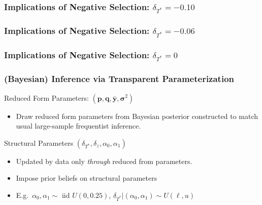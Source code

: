 \documentclass{beamer}
\begin{document}
\begin{frame}[noframenumbering]
  \frametitle{Implications of Negative Selection: $\delta_{T^*} = -0.10$}
\begin{figure}[h]
  \scriptsize
  \begingroup
  \centering
  
  \endgroup
\end{figure}
\end{frame}
\begin{frame}[noframenumbering]
  \frametitle{Implications of Negative Selection: $\delta_{T^*} = -0.06$}
\begin{figure}[h]
  \scriptsize
  \begingroup
  \centering
  
  \endgroup
\end{figure}
\end{frame}
\begin{frame}[noframenumbering]
  \frametitle{Implications of Negative Selection: $\delta_{T^*} = 0$}
\begin{figure}[h]
  \scriptsize
  \begingroup
  \centering
  
  \endgroup
\end{figure}
\end{frame}
\begin{frame}
  \frametitle{(Bayesian) Inference via Transparent Parameterization}
  \begin{block}{Reduced Form Parameters: $(\mathbf{p}, \mathbf{q}, \mathbf{\bar{y}}, \boldsymbol{\sigma}^2)$}
    \begin{itemize}
      \item Draw reduced form parameters from Bayesian posterior constructed to match usual large-sample frequentist inference.
    \end{itemize}
  \end{block}
  \begin{block}{Structural Parameters $(\delta_{T^*}, \delta_z, \alpha_0, \alpha_1)$}
    \begin{itemize}
      \item Updated by data only \emph{through} reduced from parameters. 
      \item Impose prior beliefs on structural parameters
      \item E.g.\ $\alpha_0, \alpha_1 \sim \mbox{ iid } U(0, 0.25)$, $\delta_{T^*}|(\alpha_0, \alpha_1) \sim U(\ell, u)$
    \end{itemize}
  \end{block}
  
\end{frame}
\end{document}
